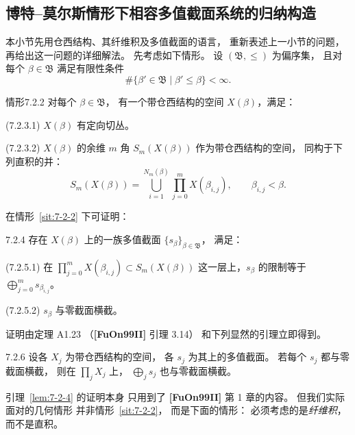 
\subsection{博特--莫尔斯情形下相容多值截面系统的归纳构造}
\label{subsec:7-2-2}

本小节先用仓西结构、其纤维积及多值截面的语言，
重新表述上一小节的问题，
再给出这一问题的详细解法。
先考虑如下情形。
设 $(\mathfrak B,\le)$ 为偏序集，
且对每个 $\beta\in\mathfrak B$ 满足有限性条件
\[
\#\{\beta'\in\mathfrak B\mid\beta'\le\beta\}<\infty.
\]

\begin{statement}{情形}{7.2.2}\label{sit:7-2-2}
对每个 $\beta\in\mathfrak B$，
有一个带仓西结构的空间 $X(\beta)$，满足：

\noindent\textup{(7.2.3.1)}\quad
$X(\beta)$ 有定向切丛。

\noindent\textup{(7.2.3.2)}\quad
$X(\beta)$ 的余维 $m$ 角
$S_m(X(\beta))$
作为带仓西结构的空间，
同构于下列直积的并：
\[
S_m(X(\beta))
=\bigcup_{i=1}^{N_m(\beta)}
\prod_{j=0}^{m}X(\beta_{i,j}),
\qquad \beta_{i,j}<\beta.
\]
\end{statement}

在情形~\ref{sit:7-2-2} 下可证明：
\begin{lemma}{7.2.4}\label{lem:7-2-4}
存在 $X(\beta)$ 上的一族多值截面
$\{s_\beta\}_{\beta\in\mathfrak B}$，
满足：

\noindent\textup{(7.2.5.1)}\quad
在
$\prod_{j=0}^{m}X(\beta_{i,j})
\subset S_m(X(\beta))$
这一层上，$s_\beta$ 的限制等于
$\bigoplus_{j=0}^{m}s_{\beta_{i,j}}$。

\noindent\textup{(7.2.5.2)}\quad
$s_\beta$ 与零截面横截。
\end{lemma}

证明由定理 A1.23
（\textbf{[FuOn99II]} 引理 3.14）
和下列显然的引理立即得到。

\begin{lemma}{7.2.6}\label{lem:7-2-6}
设各 $X_j$ 为带仓西结构的空间，
各 $s_j$ 为其上的多值截面。
若每个 $s_j$ 都与零截面横截，
则在 $\prod_jX_j$ 上，
$\bigoplus_js_j$ 也与零截面横截。
\end{lemma}

引理~\ref{lem:7-2-4} 的证明本身
只用到了 \textbf{[FuOn99II]} 第 1 章的内容。
但我们实际面对的几何情形
并非情形~\ref{sit:7-2-2}，
而是下面的情形：
必须考虑的是\emph{纤维积}，
而不是直积。

